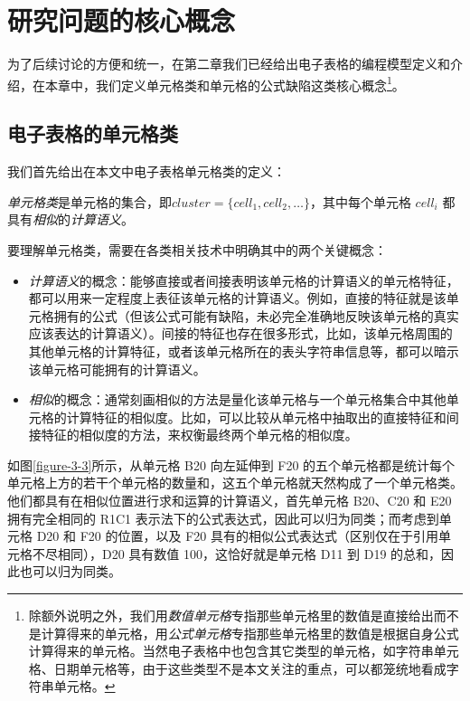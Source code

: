 \chapter{研究问题的核心概念}
为了后续讨论的方便和统一，在第二章我们已经给出电子表格的编程模型定义和介绍，在本章中，我们定义单元格类和单元格的公式缺陷这类核心概念\footnote{除额外说明之外，我们用\textit{数值单元格}专指那些单元格里的数值是直接给出而不是计算得来的单元格，用\textit{公式单元格}专指那些单元格里的数值是根据自身公式计算得来的单元格。当然电子表格中也包含其它类型的单元格，如字符串单元格、日期单元格等，由于这些类型不是本文关注的重点，可以都笼统地看成字符串单元格。}。


\section{电子表格的单元格类}

我们首先给出在本文中电子表格单元格类的定义：

\begin{definition}
    \textit{单元格类}是单元格的集合，即$cluster = \{cell_1, cell_2, \dots\}$，其中每个单元格 $cell_i$ 都具有\textit{相似}的\textit{计算语义}。
\end{definition}

要理解单元格类，需要在各类相关技术中明确其中的两个关键概念：

\begin{itemize}
    \item \textit{计算语义}的概念：能够直接或者间接表明该单元格的计算语义的单元格特征，都可以用来一定程度上表征该单元格的计算语义。例如，直接的特征就是该单元格拥有的公式（但该公式可能有缺陷，未必完全准确地反映该单元格的真实应该表达的计算语义）。间接的特征也存在很多形式，比如，该单元格周围的其他单元格的计算特征，或者该单元格所在的表头字符串信息等，都可以暗示该单元格可能拥有的计算语义。
    \item \textit{相似}的概念：通常刻画相似的方法是量化该单元格与一个单元格集合中其他单元格的计算特征的相似度。比如，可以比较从单元格中抽取出的直接特征和间接特征的相似度的方法，来权衡最终两个单元格的相似度。
\end{itemize}

如图\ref{figure-3-3}所示，从单元格 B20 向左延伸到 F20 的五个单元格都是统计每个单元格上方的若干个单元格的数量和，这五个单元格就天然构成了一个单元格类。他们都具有在相似位置进行求和运算的计算语义，首先单元格 B20、C20 和 E20 拥有完全相同的 R1C1 表示法下的公式表达式，因此可以归为同类；而考虑到单元格 D20 和 F20 的位置，以及 F20 具有的相似公式表达式（区别仅在于引用单元格不尽相同），D20 具有数值 100，这恰好就是单元格 D11 到 D19 的总和，因此也可以归为同类。

